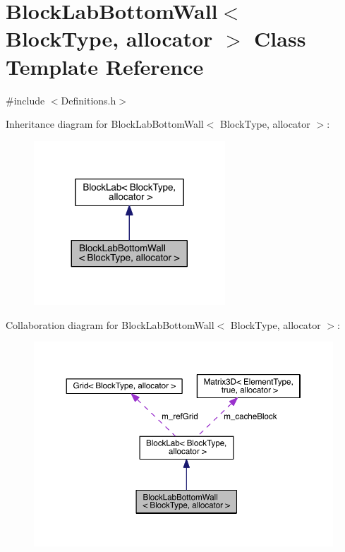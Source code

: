 \hypertarget{class_block_lab_bottom_wall}{}\section{Block\+Lab\+Bottom\+Wall$<$ Block\+Type, allocator $>$ Class Template Reference}
\label{class_block_lab_bottom_wall}


{\ttfamily \#include $<$Definitions.\+h$>$}



Inheritance diagram for Block\+Lab\+Bottom\+Wall$<$ Block\+Type, allocator $>$\+:
\nopagebreak
\begin{figure}[H]
\begin{center}
\leavevmode
\includegraphics[width=203pt]{df/d16/class_block_lab_bottom_wall__inherit__graph}
\end{center}
\end{figure}


Collaboration diagram for Block\+Lab\+Bottom\+Wall$<$ Block\+Type, allocator $>$\+:
\nopagebreak
\begin{figure}[H]
\begin{center}
\leavevmode
\includegraphics[width=350pt]{d7/dc5/class_block_lab_bottom_wall__coll__graph}
\end{center}
\end{figure}
